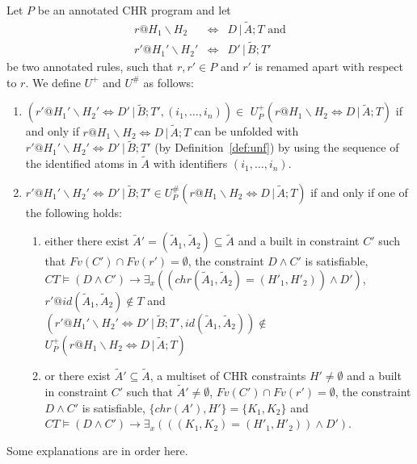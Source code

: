 \documentclass[final]{acmtrans2e}
\begin{document}
\begin{definition}\label{def:Pposeneg}

Let $P$ be an annotated CHR program and let
$$
\begin{array}{rcl}
r@H_1\backslash H_2 &\Leftrightarrow&  D\,|\,\tilde A; T \mbox{ and}\\
r'@H_1'\backslash H_2' &\Leftrightarrow & D '\,|\, \tilde B; T'
\end{array}
$$
be two annotated rules, such that $r, r'\in P$ and  $r'$ is renamed
apart with respect to $r$. We define $U^{+}$ and $U^{\#}$ as follows:
\begin{enumerate}
    \item\label{uno} $(r'@H_1'\backslash H_2' \Leftrightarrow D '\,|\, \tilde B;
T', (i_1, \ldots, i_n)) \in$ $ U^{+}_P(r@H_1\backslash H_2
\Leftrightarrow  D\,|\,\tilde A; T )$
 if and only if
$r@H_1\backslash H_2 \Leftrightarrow  D\,|\,\tilde A; T $ can be
unfolded with $r'@H_1'\backslash H_2' \Leftrightarrow D '\,|\,
\tilde B; T'$ (by Definition~\ref{def:unf}) by using the sequence
of the identified atoms in $\tilde A$ with identifiers $(i_1,
\ldots, i_n)$.
    \item\label{due} $r'@H_1'\backslash H_2' \Leftrightarrow D '\,|\, \tilde B;
T'\in  U^{\#}_P(r@H_1\backslash H_2 \Leftrightarrow D\,|\,\tilde
A; T )$ if and only if one of the
following holds: \\
\begin{enumerate}
\item\label{ai} either there exist $\tilde
    A'=(\tilde A_1, \tilde A_2) \subseteq \tilde A$ and
     a built in constraint $C'$ such that
    $Fv(C') \cap Fv(r') = \emptyset$, the constraint
    $D \wedge C'$ is satisfiable,
    $CT \models (D\wedge C') \rightarrow \exists _{x}
((chr(\tilde A_1, \tilde A_2)=(H'_1,  H'_2))\wedge D')$, $r' @id
(\tilde A_1, \tilde A_2) \not \in T$ and\\
$(r'@H_1'\backslash H_2' \Leftrightarrow D '\,|\, \tilde B; T', id
(\tilde A_1, \tilde A_2)) \not  \in$ $ U^{+}_P(r@H_1\backslash H_2
\Leftrightarrow  D\,|\,\tilde A; T )$ \\
\item\label{bi} or there exist $\tilde
    A' \subseteq \tilde A$, a multiset of CHR constraints
    $H'\neq \emptyset$ and
     a built in constraint $C'$ such that $\tilde A'\neq
     \emptyset$,
    $Fv(C') \cap Fv(r') = \emptyset$, the constraint
    $D \wedge C'$ is satisfiable, $\{chr(A'), H'\}= \{K_1, K_2\}$
    and
    $CT \models (D\wedge C') \rightarrow \exists _{x}
(((K_1, K_2)=(H'_1,  H'_2))\wedge D')$.\\
\end{enumerate}
\end{enumerate}
\end{definition}
Some explanations are in order here.
\end{document}
